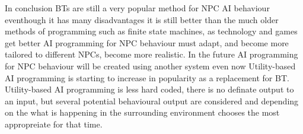 \documentclass{scrartcl}
\begin{document}
In conclusion BTs are still a very popular method for NPC AI behaviour eventhough it has many disadvantages it is still better than the much older methods of programming such as finite state machines, as technology and games get better AI programming for NPC behaviour must adapt, and become more tailored to different NPCs, become more realistic. In the future AI programming for NPC behaviour will be created using another system even now Utility-based AI programming is starting to increase in popularity as a replacement for BT\cite{Gama}. Utility-based AI programming is less hard coded, there is no definate output to an input, but several potential behavioural output are considered and depending on the what is happening in the surrounding environment chooses the most appropreiate for that time\cite{othman2014implementing}.



\end{document}
